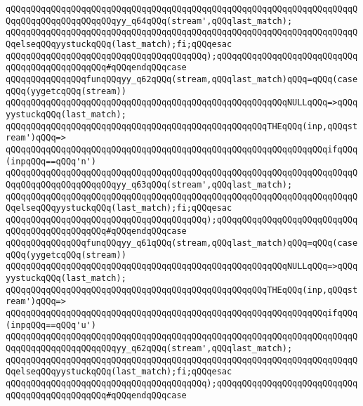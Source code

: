 \verb|qQQqqQQqqQQqqQQqqQQqqQQqqQQqqQQqqQQqqQQqqQQqqQQqqQQqqQQqqQQqqQQqqQQqqQQqqQQqqQQqqQQqqQQqqQQqyy_q64qQQq(stream',qQQqlast_match);|\newline
\verb|qQQqqQQqqQQqqQQqqQQqqQQqqQQqqQQqqQQqqQQqqQQqqQQqqQQqqQQqqQQqqQQqqQQqqQQqelseqQQqyystuckqQQq(last_match);fi;qQQqesac|\newline
\verb|qQQqqQQqqQQqqQQqqQQqqQQqqQQqqQQqqQQqqQQq);qQQqqQQqqQQqqQQqqQQqqQQqqQQqqQQqqQQqqQQqqQQqqQQq#qQQqendqQQqcase|\newline
\verb|qQQqqQQqqQQqqQQqfunqQQqyy_q62qQQq(stream,qQQqlast_match)qQQq=qQQq(caseqQQq(yygetcqQQq(stream))|\newline
\verb|qQQqqQQqqQQqqQQqqQQqqQQqqQQqqQQqqQQqqQQqqQQqqQQqqQQqqQQqNULLqQQq=>qQQqyystuckqQQq(last_match);|\newline
\verb|qQQqqQQqqQQqqQQqqQQqqQQqqQQqqQQqqQQqqQQqqQQqqQQqqQQqTHEqQQq(inp,qQQqstream')qQQq=>|\newline
\verb|qQQqqQQqqQQqqQQqqQQqqQQqqQQqqQQqqQQqqQQqqQQqqQQqqQQqqQQqqQQqqQQqifqQQq(inpqQQq==qQQq'n')|\newline
\verb|qQQqqQQqqQQqqQQqqQQqqQQqqQQqqQQqqQQqqQQqqQQqqQQqqQQqqQQqqQQqqQQqqQQqqQQqqQQqqQQqqQQqqQQqqQQqyy_q63qQQq(stream',qQQqlast_match);|\newline
\verb|qQQqqQQqqQQqqQQqqQQqqQQqqQQqqQQqqQQqqQQqqQQqqQQqqQQqqQQqqQQqqQQqqQQqqQQqelseqQQqyystuckqQQq(last_match);fi;qQQqesac|\newline
\verb|qQQqqQQqqQQqqQQqqQQqqQQqqQQqqQQqqQQqqQQq);qQQqqQQqqQQqqQQqqQQqqQQqqQQqqQQqqQQqqQQqqQQqqQQq#qQQqendqQQqcase|\newline
\verb|qQQqqQQqqQQqqQQqfunqQQqyy_q61qQQq(stream,qQQqlast_match)qQQq=qQQq(caseqQQq(yygetcqQQq(stream))|\newline
\verb|qQQqqQQqqQQqqQQqqQQqqQQqqQQqqQQqqQQqqQQqqQQqqQQqqQQqqQQqNULLqQQq=>qQQqyystuckqQQq(last_match);|\newline
\verb|qQQqqQQqqQQqqQQqqQQqqQQqqQQqqQQqqQQqqQQqqQQqqQQqqQQqTHEqQQq(inp,qQQqstream')qQQq=>|\newline
\verb|qQQqqQQqqQQqqQQqqQQqqQQqqQQqqQQqqQQqqQQqqQQqqQQqqQQqqQQqqQQqqQQqifqQQq(inpqQQq==qQQq'u')|\newline
\verb|qQQqqQQqqQQqqQQqqQQqqQQqqQQqqQQqqQQqqQQqqQQqqQQqqQQqqQQqqQQqqQQqqQQqqQQqqQQqqQQqqQQqqQQqqQQqyy_q62qQQq(stream',qQQqlast_match);|\newline
\verb|qQQqqQQqqQQqqQQqqQQqqQQqqQQqqQQqqQQqqQQqqQQqqQQqqQQqqQQqqQQqqQQqqQQqqQQqelseqQQqyystuckqQQq(last_match);fi;qQQqesac|\newline
\verb|qQQqqQQqqQQqqQQqqQQqqQQqqQQqqQQqqQQqqQQq);qQQqqQQqqQQqqQQqqQQqqQQqqQQqqQQqqQQqqQQqqQQqqQQq#qQQqendqQQqcase|\newline
